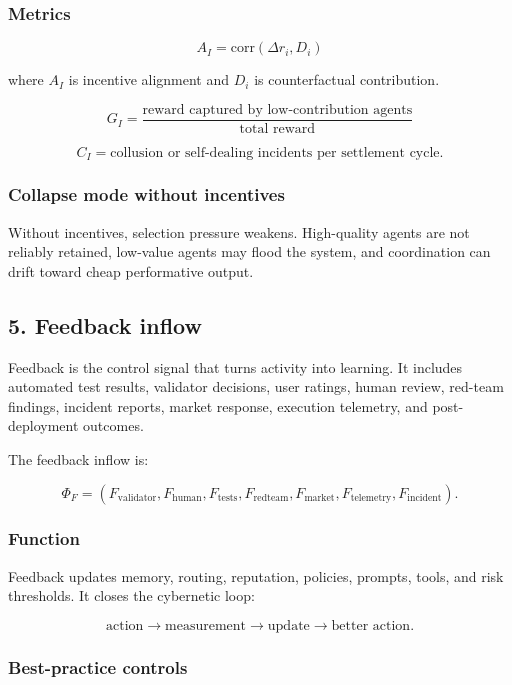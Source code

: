 \documentclass[11pt]{article}
\begin{document}
\subsubsection{Metrics}\label{metrics-3}

\[
A_I=\text{corr}(\Delta r_i,D_i)
\]

where \(A_I\) is incentive alignment and \(D_i\) is counterfactual contribution.

\[
G_I=\frac{\text{reward captured by low-contribution agents}}{\text{total reward}}
\]

\[
C_I=\text{collusion or self-dealing incidents per settlement cycle}.
\]

\subsubsection{Collapse mode without incentives}\label{collapse-mode-without-incentives}

Without incentives, selection pressure weakens. High-quality agents are not reliably retained, low-value agents may flood the system, and coordination can drift toward cheap performative output.

\subsection{5. Feedback inflow}\label{feedback-inflow}

Feedback is the control signal that turns activity into learning. It includes automated test results, validator decisions, user ratings, human review, red-team findings, incident reports, market response, execution telemetry, and post-deployment outcomes.

The feedback inflow is:

\[
\Phi_F=(F_{\text{validator}},F_{\text{human}},F_{\text{tests}},F_{\text{redteam}},F_{\text{market}},F_{\text{telemetry}},F_{\text{incident}}).
\]

\subsubsection{Function}\label{function-4}

Feedback updates memory, routing, reputation, policies, prompts, tools, and risk thresholds. It closes the cybernetic loop:

\[
\text{action}\rightarrow\text{measurement}\rightarrow\text{update}\rightarrow\text{better action}.
\]

\subsubsection{Best-practice controls}\label{best-practice-controls-4}
\end{document}
